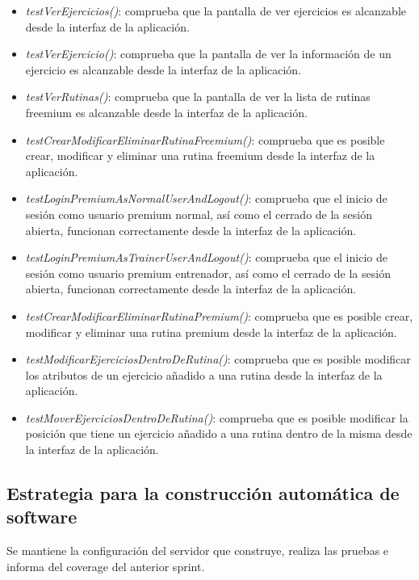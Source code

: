 \documentclass[11pt,a4paper]{report}
\begin{document}
\begin{itemize}
	\item \textit{testVerEjercicios()}: comprueba que la pantalla de ver ejercicios es alcanzable desde la interfaz de la aplicación.

	\item \textit{testVerEjercicio()}: comprueba que la pantalla de ver la información de un ejercicio es alcanzable desde la interfaz de la aplicación.

	\item \textit{testVerRutinas()}: comprueba que la pantalla de ver la lista de rutinas freemium es alcanzable desde la interfaz de la aplicación.

	\item \textit{testCrearModificarEliminarRutinaFreemium()}: comprueba que es posible crear, modificar y eliminar una rutina freemium desde la interfaz de la aplicación.

	\item \textit{testLoginPremiumAsNormalUserAndLogout()}: comprueba que el inicio de sesión como usuario premium normal, así como el cerrado de la sesión abierta, funcionan correctamente desde la interfaz de la aplicación.

	\item \textit{testLoginPremiumAsTrainerUserAndLogout()}: comprueba que el inicio de sesión como usuario premium entrenador, así como el cerrado de la sesión abierta, funcionan correctamente desde la interfaz de la aplicación.

	\item \textit{testCrearModificarEliminarRutinaPremium()}: comprueba que es posible crear, modificar y eliminar una rutina premium desde la interfaz de la aplicación.

	\item \textit{testModificarEjerciciosDentroDeRutina()}: comprueba que es posible modificar los atributos de un ejercicio añadido a una rutina desde la interfaz de la aplicación.

	\item \textit{testMoverEjerciciosDentroDeRutina()}: comprueba que es posible modificar la posición que tiene  un ejercicio añadido a una rutina dentro de la misma desde la interfaz de la aplicación.
\end{itemize}
\subsection{Estrategia para la construcción automática de software}
Se mantiene la configuración del servidor que construye, realiza las pruebas e informa del coverage del anterior sprint.
\end{document}
